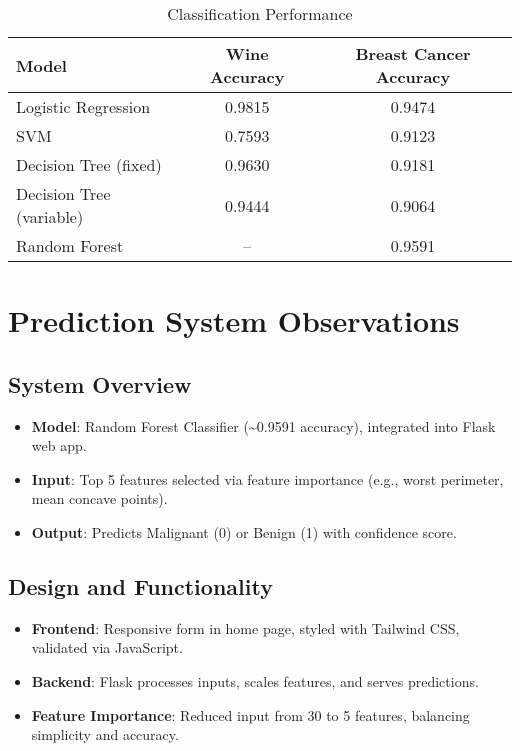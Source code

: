 \documentclass[a4paper,12pt]{article}
\begin{document}
\begin{table}[h]
    \centering
    \caption{Classification Performance}
    \begin{tabular}{lcc}
        \toprule
        \textbf{Model} & \textbf{Wine Accuracy} & \textbf{Breast Cancer Accuracy} \\
        \midrule
        Logistic Regression & 0.9815 & 0.9474 \\
        SVM & 0.7593 & 0.9123 \\
        Decision Tree (fixed) & 0.9630 & 0.9181 \\
        Decision Tree (variable) & 0.9444 & 0.9064 \\
        Random Forest & -- & 0.9591 \\
        \bottomrule
    \end{tabular}
\end{table}

\section{Prediction System Observations}
\subsection{System Overview}
\begin{itemize}[noitemsep]
    \item \textbf{Model}: Random Forest Classifier (\textasciitilde0.9591 accuracy), integrated into Flask web app.
    \item \textbf{Input}: Top 5 features selected via feature importance (e.g., worst perimeter, mean concave points).
    \item \textbf{Output}: Predicts Malignant (0) or Benign (1) with confidence score.
\end{itemize}

\subsection{Design and Functionality}
\begin{itemize}[noitemsep]
    \item \textbf{Frontend}: Responsive form in home page, styled with Tailwind CSS, validated via JavaScript.
    \item \textbf{Backend}: Flask processes inputs, scales features, and serves predictions.
    \item \textbf{Feature Importance}: Reduced input from 30 to 5 features, balancing simplicity and accuracy.
\end{itemize}
\end{document}
